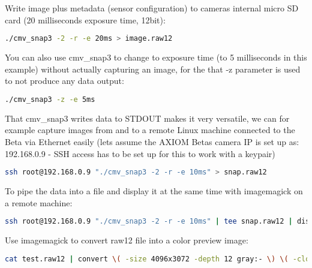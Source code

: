 Write image plus metadata (sensor configuration) to cameras internal micro SD card (20 milliseconds exposure time, 12bit): 

\begin{lstlisting}[language=bash,morekeywords=$,keywordstyle=\bfseries,frame=none,xleftmargin=.25in,belowskip=2em, aboveskip=2em]
./cmv_snap3 -2 -r -e 20ms > image.raw12
\end{lstlisting} 

You can also use cmv_snap3 to change to exposure time (to 5 milliseconds in this example) without actually capturing an image, for the that -z parameter is used to not produce any data output: 

\begin{lstlisting}[language=bash,morekeywords=$,keywordstyle=\bfseries,frame=none,xleftmargin=.25in,belowskip=2em, aboveskip=2em]
./cmv_snap3 -z -e 5ms
\end{lstlisting} 

That cmv_snap3 writes data to STDOUT makes it very versatile, we can for example capture images from and to a remote Linux machine connected to the Beta via Ethernet easily (lets assume the AXIOM Betas camera IP is set up as: 192.168.0.9 - SSH access has to be set up for this to work with a keypair) 

\begin{lstlisting}[language=bash,morekeywords=$,keywordstyle=\bfseries,frame=none,xleftmargin=.25in,belowskip=2em, aboveskip=2em]
ssh root@192.168.0.9 "./cmv_snap3 -2 -r -e 10ms" > snap.raw12
\end{lstlisting} 

To pipe the data into a file and display it at the same time with imagemagick on a remote machine: 

\begin{lstlisting}[language=bash,morekeywords=$,keywordstyle=\bfseries,frame=none,xleftmargin=.25in,belowskip=2em, aboveskip=2em]
    ssh root@192.168.0.9 "./cmv_snap3 -2 -r -e 10ms" | tee snap.raw12 | display -size 4096x3072 -depth 12 gray:-
\end{lstlisting} 

Use imagemagick to convert raw12 file into a color preview image: 

\begin{lstlisting}[language=bash,morekeywords=$,keywordstyle=\bfseries,frame=none,xleftmargin=.25in,belowskip=2em, aboveskip=2em]
cat test.raw12 | convert \( -size 4096x3072 -depth 12 gray:- \) \( -clone 0 -crop -1-1 \) \( -clone 0 -crop -1+0 \) \( -clone 0 -crop +0-1 \) -sample 2048x1536 \( -clone 2,3 -average \) -delete 2,3 -swap 0,1 +swap -combine test_color.png
\end{lstlisting} 


